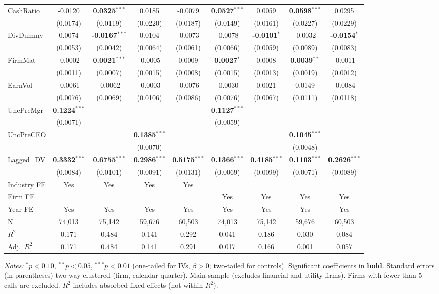 \documentclass[11pt,a4paper]{article}
\begin{document}
\begin{table}[htbp]
\begin{tabular}{lcccccccc}
CashRatio & -0.0120 & \textbf{0.0325}$^{***}$ & 0.0185 & -0.0079 & \textbf{0.0527}$^{***}$ & 0.0059 & \textbf{0.0598}$^{***}$ & 0.0295 \\
 & (0.0174) & (0.0119) & (0.0220) & (0.0187) & (0.0149) & (0.0161) & (0.0227) & (0.0229) \\
DivDummy & 0.0074 & \textbf{-0.0167}$^{***}$ & 0.0104 & -0.0073 & -0.0078 & \textbf{-0.0101}$^{*}$ & -0.0032 & \textbf{-0.0154}$^{*}$ \\
 & (0.0053) & (0.0042) & (0.0064) & (0.0061) & (0.0066) & (0.0059) & (0.0089) & (0.0083) \\
FirmMat & -0.0002 & \textbf{0.0021}$^{***}$ & -0.0005 & 0.0009 & \textbf{0.0027}$^{*}$ & 0.0008 & \textbf{0.0039}$^{**}$ & -0.0011 \\
 & (0.0011) & (0.0007) & (0.0015) & (0.0008) & (0.0015) & (0.0013) & (0.0019) & (0.0012) \\
EarnVol & -0.0061 & -0.0062 & -0.0003 & -0.0076 & -0.0030 & 0.0021 & 0.0149 & -0.0084 \\
 & (0.0076) & (0.0069) & (0.0106) & (0.0086) & (0.0076) & (0.0067) & (0.0111) & (0.0118) \\
UncPreMgr & \textbf{0.1224}$^{***}$ &  &  &  & \textbf{0.1127}$^{***}$ &  &  &  \\
 & (0.0071) &  &  &  & (0.0059) &  &  &  \\
UncPreCEO &  &  & \textbf{0.1385}$^{***}$ &  &  &  & \textbf{0.1045}$^{***}$ &  \\
 &  &  & (0.0070) &  &  &  & (0.0048) &  \\
Lagged\_DV & \textbf{0.3332}$^{***}$ & \textbf{0.6755}$^{***}$ & \textbf{0.2986}$^{***}$ & \textbf{0.5175}$^{***}$ & \textbf{0.1366}$^{***}$ & \textbf{0.4185}$^{***}$ & \textbf{0.1103}$^{***}$ & \textbf{0.2626}$^{***}$ \\
 & (0.0084) & (0.0101) & (0.0091) & (0.0131) & (0.0069) & (0.0099) & (0.0071) & (0.0089) \\
\midrule
Industry FE & Yes & Yes & Yes & Yes &  &  &  &  \\
Firm FE &  &  &  &  & Yes & Yes & Yes & Yes \\
Year FE & Yes & Yes & Yes & Yes & Yes & Yes & Yes & Yes \\
\midrule
N & 74,013 & 75,142 & 59,676 & 60,503 & 74,013 & 75,142 & 59,676 & 60,503 \\
$R^2$ & 0.171 & 0.484 & 0.141 & 0.292 & 0.041 & 0.186 & 0.030 & 0.084 \\
Adj.~$R^2$ & 0.171 & 0.484 & 0.141 & 0.291 & 0.017 & 0.166 & 0.001 & 0.057 \\
\bottomrule
\end{tabular}
\begin{minipage}{\linewidth}
\vspace{2pt}\scriptsize
\textit{Notes:} $^{*}p<0.10$, $^{**}p<0.05$, $^{***}p<0.01$ (one-tailed for IVs, $\beta > 0$; two-tailed for controls).
 Significant coefficients in \textbf{bold}.
 Standard errors (in parentheses) two-way clustered (firm, calendar quarter).
 Main sample (excludes financial and utility firms). Firms with fewer than 5 calls are excluded.
 $R^2$ includes absorbed fixed effects (not within-$R^2$).
\end{minipage}
\end{table}
\end{document}
